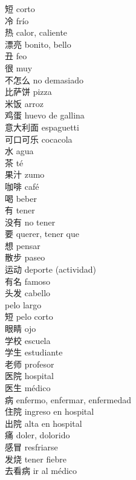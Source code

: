 短 \quad corto\\
冷 \quad frío\\
热 \quad calor, caliente\\
漂亮 \quad bonito, bello\\
丑 \quad feo\\
很 \quad muy\\
不怎么 \quad no demasiado\\
比萨饼 \quad pizza\\
米饭 \quad arroz\\
鸡蛋 \quad huevo de gallina\\
意大利面 \quad espaguetti\\
可口可乐 \quad cocacola\\
水 \quad agua\\
茶 \quad té\\
果汁 \quad zumo\\
咖啡 \quad café\\
喝 \quad beber\\
有 \quad tener\\
没有 \quad no tener\\
要 \quad querer, tener que\\
想 \quad pensar\\
散步 \quad paseo\\
运动 \quad deporte (actividad)\\
有名 \quad famoso\\
头发 \quad cabello\\
 \quad pelo largo\\
短 \quad pelo corto\\
眼睛 \quad ojo\\
学校 \quad escuela\\
学生 \quad estudiante\\
老师 \quad profesor\\
医院 \quad hospital\\
医生 \quad médico\\
病 \quad enfermo, enfermar, enfermedad\\
住院 \quad ingreso en hospital\\
出院 \quad alta en hospital\\
痛 \quad doler, dolorido\\
感冒 \quad resfriarse\\
发烧 \quad tener fiebre\\
去看病 \quad ir al médico\\